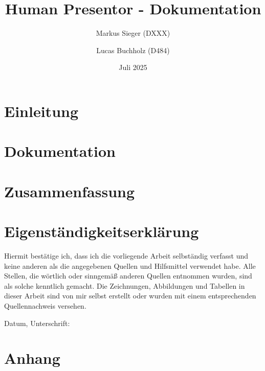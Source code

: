 \documentclass[12pt, headheight=21.8pt, footheight=21.8pt, oneside]{scrbook}
\title{Human Presentor - Dokumentation}
\author{Markus Sieger (DXXX) \and Lucas Buchholz (D484)}
\date{Juli 2025}
\begin{document}
\maketitle
\tableofcontents
\pagestyle{empty}



\chapter{Einleitung} \pagestyle{headings}


\chapter{Dokumentation}


\chapter{Zusammenfassung}






\chapter{Eigenständigkeitserklärung}
Hiermit bestätige ich, dass ich die vorliegende Arbeit 
selbständig verfasst und keine anderen als die 
angegebenen Quellen und Hilfsmittel verwendet habe. 
Alle Stellen, die wörtlich oder sinngemäß anderen 
Quellen entnommen wurden, sind als solche kenntlich 
gemacht. Die Zeichnungen, Abbildungen und Tabellen in 
dieser Arbeit sind von mir selbst erstellt oder wurden mit 
einem entsprechenden Quellennachweis versehen.

Datum, Unterschrift:




\appendix

\chapter{Anhang}
\end{document}
